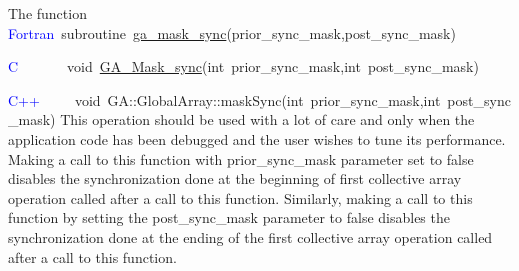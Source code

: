 The function
\textcolor{blue}{Fortran}~subroutine~\href{http://www.emsl.pnl.gov/docs/global/ga_ops.html\#ga_mask_sync}{ga\_{}mask\_{}sync}(prior\_sync\_mask,post\_sync\_mask)

\textcolor{blue}{C}~~~~~~~void~\href{http://www.emsl.pnl.gov/docs/global/c_nga_ops.html\#ga_mask_sync}{GA\_{}Mask\_{}sync}(int~prior\_sync\_mask,int~post\_sync\_mask)

\textcolor{blue}{C++}~~~~~void~GA::GlobalArray::maskSync(int~prior\_sync\_mask,int~post\_sync\_mask)
This operation should be used with a lot of care and only when the
application code has been debugged and the user wishes to tune its
performance. Making a call to this function with prior\_sync\_mask
parameter set to false disables the synchronization done at the beginning
of first collective array operation called after a call to this function.
Similarly, making a call to this function by setting the post\_sync\_mask
parameter to false disables the synchronization done at the ending
of the first collective array operation called after a call to this
function.
